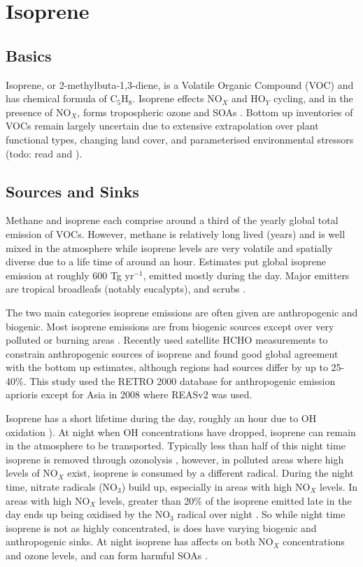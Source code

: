 \section{Isoprene}
\label{ch_LitRev:sec:isoprene}

  \subsection{Basics}
    Isoprene, or 2-methylbuta-1,3-diene, is a Volatile Organic Compound (VOC) and has chemical formula of C$_5$H$_8$. 
    Isoprene effects NO$_X$ and HO$_Y$ cycling, and in the presence of NO$_X$, forms tropospheric ozone and SOAs \citep{Wagner2002, Millet2006}.
    Bottom up inventories of VOCs remain largely uncertain due to extensive extrapolation over plant functional types, changing land cover, and parameterised environmental stressors (todo: read and \citep{Guenther2000}).

  \subsection{Sources and Sinks}
    Methane and isoprene each comprise around a third of the yearly global total emission of VOCs.
    However, methane is relatively long lived (years) and is well mixed in the atmosphere while isoprene levels are very volatile and spatially diverse due to a life time of around an hour.
    Estimates put global isoprene emission at roughly 600 Tg yr$^{-1}$, emitted mostly during the day.
    Major emitters are tropical broadleafs (notably eucalypts), and scrubs \citep{Guenther2006, Arneth2008, Niinemets2010, Monks2015}.

   The two main categories isoprene emissions are often given are anthropogenic and biogenic. 
   Most isoprene emissions are from biogenic sources except over very polluted or burning areas \citep{Guenther2006}.
   Recently \cite{Stavrakou2015} used satellite HCHO measurements to constrain anthropogenic sources of isoprene and found good global agreement with the bottom up estimates, although regions had sources differ by up to 25-40\%. 
   This study used the RETRO 2000 database for anthropogenic emission aprioris except for Asia in 2008 where REASv2 was used. 
    
    Isoprene has a short lifetime during the day, roughly an hour due to OH oxidation \citep{AtkinsonArey2003}).
    At night when OH concentrations have dropped, isoprene can remain in the atmosphere to be transported. 
    Typically less than half of this night time isoprene is removed through ozonolysis \citep{AtkinsonArey2003}, however, in polluted areas where high levels of NO$_X$ exist, isoprene is consumed by a different radical.
    During the night time, nitrate radicals (NO$_3$) build up, especially in areas with high NO$_X$ levels.
    In areas with high NO$_X$ levels, greater than 20\% of the isoprene emitted late in the day ends up being oxidised by the NO$_3$ radical over night \citep{Brown2009}.
    So while night time isoprene is not as highly concentrated, is does have varying biogenic and anthropogenic sinks.
    At night isoprene has affects on both NO$_X$ concentrations and ozone levels, and can form harmful SOAs \citep{Brown2009, Mao2013}.
    
